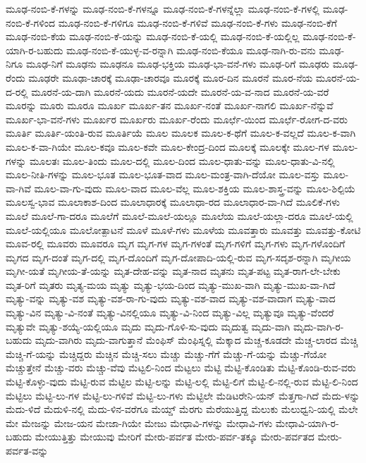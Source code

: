{ಮೂಢ-ನಂಬಿ-ಕೆ-ಗಳನ್ನು
ಮೂಢ-ನಂಬಿ-ಕೆ-ಗಳನ್ನೂ
ಮೂಢ-ನಂಬಿ-ಕೆ-ಗಳನ್ನೆಲ್ಲಾ
ಮೂಢ-ನಂಬಿ-ಕೆ-ಗಳಲ್ಲಿ
ಮೂಢ-ನಂಬಿ-ಕೆ-ಗಳಿಂದ
ಮೂಢ-ನಂಬಿ-ಕೆ-ಗಳಿಗೂ
ಮೂಢ-ನಂಬಿ-ಕೆ-ಗಳಿವೆ
ಮೂಢ-ನಂಬಿ-ಕೆ-ಗಳು
ಮೂಢ-ನಂಬಿ-ಕೆಗೆ
ಮೂಢ-ನಂಬಿ-ಕೆಯ
ಮೂಢ-ನಂಬಿ-ಕೆ-ಯನ್ನು
ಮೂಢ-ನಂಬಿ-ಕೆ-ಯಲ್ಲಿ
ಮೂಢ-ನಂಬಿ-ಕೆ-ಯಲ್ಲಿಲ್ಲ
ಮೂಢ-ನಂಬಿ-ಕೆ-ಯಾಗಿ-ರ-ಬಹುದು
ಮೂಢ-ನಂಬಿ-ಕೆ-ಯುಳ್ಳ-ವ-ರನ್ನಾಗಿ
ಮೂಢ-ನಂಬಿ-ಕೆಯೂ
ಮೂಢ-ನಾಗಿ-ರು-ವನು
ಮೂಢ-ನಿಗೂ
ಮೂಢ-ನಿಗೆ
ಮೂಢನು
ಮೂಢನೂ
ಮೂಢ-ಭಕ್ತಿಯ
ಮೂಢ-ಭಾ-ವನೆ-ಗಳು
ಮೂಢ-ರಿಗೆ
ಮೂಢರು
ಮೂಢ-ರೆಂದು
ಮೂಢರೇ
ಮೂಢಾ-ಚಾರಕ್ಕೆ
ಮೂಢಾ-ಚಾರವೂ
ಮೂರಕ್ಕೆ
ಮೂರ-ದಿನ
ಮೂರನೆ
ಮೂರ-ನೆಯ
ಮೂರನೆ-ಯ-ದ-ರಲ್ಲಿ
ಮೂರನೆ-ಯ-ದಾಗಿ
ಮೂರನೆ-ಯದು
ಮೂರನೆ-ಯದೇ
ಮೂರನೆ-ಯ-ವ-ನಾದ
ಮೂರನೆ-ಯ-ವರೆ
ಮೂರನ್ನು
ಮೂರು
ಮೂರೂ
ಮೂರ್ಖ
ಮೂರ್ಖ-ತನ
ಮೂರ್ಖ-ನಂತೆ
ಮೂರ್ಖ-ನಾಗಲಿ
ಮೂರ್ಖ-ನೆನ್ನುವೆ
ಮೂರ್ಖ-ಭಾ-ವನೆ-ಗಳು
ಮೂರ್ಖರ
ಮೂರ್ಖರು
ಮೂರ್ಖ-ರೆಂದು
ಮೂರ್ಛೆ-ಯಿಂದ
ಮೂರ್ಛೆ-ರೋಗ-ದ-ವರು
ಮೂರ್ತಿ
ಮೂರ್ತಿ-ಯಂತಿ-ರುವ
ಮೂರ್ತಿಯೆ
ಮೂಲ
ಮೂಲಕ
ಮೂಲ-ಕ-ಥೆಗೆ
ಮೂಲ-ಕ-ವಲ್ಲದೆ
ಮೂಲ-ಕ-ವಾಗಿ
ಮೂಲ-ಕ-ವಾ-ಗಿಯೇ
ಮೂಲ-ಕವೂ
ಮೂಲ-ಕವೇ
ಮೂಲ-ಕೇಂದ್ರ-ದಿಂದ
ಮೂಲಕ್ಕೆ
ಮೂಲಕ್ಕೇ
ಮೂಲ-ಗಳ
ಮೂಲ-ಗಳನ್ನು
ಮೂಲತಃ
ಮೂಲ-ತಿಂದು
ಮೂಲ-ದಲ್ಲಿ
ಮೂಲ-ದಿಂದ
ಮೂಲ-ಧಾತು-ವನ್ನು
ಮೂಲ-ಧಾತು-ವಿ-ನಲ್ಲಿ
ಮೂಲ-ನೀತಿ-ಗಳನ್ನು
ಮೂಲ-ಭೂತ
ಮೂಲ-ಭೂತ-ವಾದ
ಮೂಲ-ಮಂತ್ರ-ವಾಗಿ-ದೆಯೋ
ಮೂಲ-ವಸ್ತು
ಮೂಲ-ವಾ-ಗಿವೆ
ಮೂಲ-ವಾ-ಗು-ವುದು
ಮೂಲ-ವಾದ
ಮೂಲ-ವೆಲ್ಲ
ಮೂಲ-ಶಕ್ತಿಯ
ಮೂಲ-ಶಾಸ್ತ್ರ-ವನ್ನು
ಮೂಲ-ಶಿಲ್ಪಿಯೆ
ಮೂಲಸ್ವ-ಭಾವ
ಮೂಲಾಕಾಶ-ದಿಂದ
ಮೂಲಾಧಾರಕ್ಕೆ
ಮೂಲಾಧಾ-ರದ
ಮೂಲಾಧಾರ-ವಾ-ಗಿದೆ
ಮೂಲಿಕೆ-ಗಳು
ಮೂಲೆ
ಮೂಲೆ-ಗಾ-ದರೂ
ಮೂಲೆಗೆ
ಮೂಲೆ-ಮೂಲೆ-ಯಲ್ಲೂ
ಮೂಲೆಯ
ಮೂಲೆ-ಯಲ್ಲಾ-ದರೂ
ಮೂಲೆ-ಯಲ್ಲಿ
ಮೂಲೆ-ಯಲ್ಲಿಯೂ
ಮೂಲೋತ್ಪಾಟನೆ
ಮೂಳೆ
ಮೂಳೆ-ಗಳು
ಮೂಳೆಯ
ಮೂವತ್ತಾರು
ಮೂವತ್ತು
ಮೂವತ್ತು-ಕೋಟಿ
ಮೂವ-ರಲ್ಲಿ
ಮೂವರು
ಮೂವರೂ
ಮೃಗ
ಮೃಗ-ಗಳ
ಮೃಗ-ಗಳಂತೆ
ಮೃಗ-ಗಳಿಗೆ
ಮೃಗ-ಗಳು
ಮೃಗ-ಗಳೊಂದಿಗೆ
ಮೃಗದ
ಮೃಗ-ದಂತೆ
ಮೃಗ-ದಲ್ಲಿ
ಮೃಗ-ದೊಂದಿಗೆ
ಮೃಗ-ದೋಪಾದಿ-ಯಲ್ಲಿ-ರುವ
ಮೃಗ-ಸದೃಶ-ರನ್ನಾಗಿ
ಮೃಗೀಯ
ಮೃಗೀ-ಯತೆ
ಮೃಗೀಯ-ತೆ-ಯನ್ನು
ಮೃತ-ದೇಹ-ವನ್ನು
ಮೃತ-ನಾದ
ಮೃತನು
ಮೃತ-ಪಟ್ಟ
ಮೃತ-ರಾಗ-ಲೇ-ಬೇಕು
ಮೃತ-ರಿಗೆ
ಮೃತರು
ಮೃತ್ಯ-ಮಯ
ಮೃತ್ಯು
ಮೃತ್ಯು-ಭಯ-ದಿಂದ
ಮೃತ್ಯು-ಮುಖ-ವಾಗಿ
ಮೃತ್ಯು-ಮುಖ-ವಾ-ಗಿದೆ
ಮೃತ್ಯು-ವನ್ನು
ಮೃತ್ಯು-ವಶ
ಮೃತ್ಯು-ವಶ-ರಾ-ಗು-ವುದು
ಮೃತ್ಯು-ವಶ-ವಾದ
ಮೃತ್ಯು-ವಶ-ವಾದಾಗ
ಮೃತ್ಯು-ವಾದ
ಮೃತ್ಯು-ವಿನ
ಮೃತ್ಯು-ವಿ-ನಂತೆ
ಮೃತ್ಯು-ವಿನಲ್ಲಿಯೂ
ಮೃತ್ಯು-ವಿ-ನಿಂದ
ಮೃತ್ಯು-ವಿಲ್ಲ
ಮೃತ್ಯುವೂ
ಮೃತ್ಯು-ವೆಂದರೆ
ಮೃತ್ಯುವೇ
ಮೃತ್ಯು-ಶಯ್ಯೆ-ಯಲ್ಲಿಯೂ
ಮೃದು
ಮೃದು-ಗೊಳಿ-ಸು-ವುದು
ಮೃದುತ್ವ
ಮೃದು-ವಾಗಿ
ಮೃದು-ವಾಗಿ-ರ-ಬಹುದು
ಮೃದು-ವಾಗಿರು
ಮೃದು-ವಾಗುತ್ತಾನೆ
ಮೆಂಫಿಸ್
ಮೆಂಫಿಸ್ನಲ್ಲಿ
ಮೆಕ್ಕಾದ
ಮೆಚ್ಚ-ಕೂಡದೇ
ಮೆಚ್ಚ-ಲಾರದ
ಮೆಚ್ಚಿ
ಮೆಚ್ಚಿ-ಗೆ-ಯನ್ನು
ಮೆಚ್ಚಿದ್ದರು
ಮೆಚ್ಚಿನ
ಮೆಚ್ಚಿ-ಸಲು
ಮೆಚ್ಚು
ಮೆಚ್ಚು-ಗೆಗೆ
ಮೆಚ್ಚು-ಗೆ-ಯನ್ನು
ಮೆಚ್ಚು-ಗೆಯೋ
ಮೆಚ್ಚುತ್ತೇನೆ
ಮೆಚ್ಚು-ವರು
ಮೆಚ್ಚು-ವೆವು
ಮೆಟ್ಟಲಿ-ನಿಂದ
ಮೆಟ್ಟಲು
ಮೆಟ್ಟಿ
ಮೆಟ್ಟಿ-ಕೊಂಡಿತು
ಮೆಟ್ಟಿ-ಕೊಂಡಿ-ರುವ-ವರು
ಮೆಟ್ಟಿ-ಕೊಳ್ಳು-ವುದು
ಮೆಟ್ಟಿ-ರುವ
ಮೆಟ್ಟಿಲ
ಮೆಟ್ಟಿ-ಲನ್ನು
ಮೆಟ್ಟಿ-ಲಲ್ಲಿ
ಮೆಟ್ಟಿ-ಲಿಗೆ
ಮೆಟ್ಟಿ-ಲಿ-ನಲ್ಲಿ-ರುವ
ಮೆಟ್ಟಿ-ಲಿ-ನಿಂದ
ಮೆಟ್ಟಿಲು
ಮೆಟ್ಟಿ-ಲು-ಗಳ
ಮೆಟ್ಟಿ-ಲು-ಗಳಿವೆ
ಮೆಟ್ಟಿ-ಲು-ಗಳು
ಮೆಟ್ಟಿಲೇ
ಮೆಡಿಟರೇನಿ-ಯನ್
ಮೆತ್ತಗಾ-ಗಿದೆ
ಮೆದು-ಳನ್ನು
ಮೆದು-ಳಿದೆ
ಮೆದುಳಿ-ನಲ್ಲಿ
ಮೆದು-ಳಿನ-ವರೆಗೂ
ಮೆಯ್ಡ್
ಮೆರಗು
ಮೆರೆಯುತ್ತಿದ್ದ
ಮೆಲುಕು
ಮೆಲುಧ್ವನಿ-ಯಲ್ಲಿ
ಮೆಲೇ
ಮೇ
ಮೇಜನ್ನು
ಮೇಜ-ಯನ
ಮೇಜಾ-ಗಿಯೇ
ಮೇಜು
ಮೇಧಾವಿ-ಗಳನ್ನು
ಮೇಧಾವಿ-ಗಳು
ಮೇಧಾವಿ-ಯಾಗಿ-ರ-ಬಹುದು
ಮೇಯುತ್ತಿತ್ತು
ಮೇಯುವು
ಮೇರಿಗೆ
ಮೇರು-ಪರ್ವತ
ಮೇರು-ಪರ್ವ-ತಕ್ಕೂ
ಮೇರು-ಪರ್ವತದ
ಮೇರು-ಪರ್ವತ-ವನ್ನು
}
